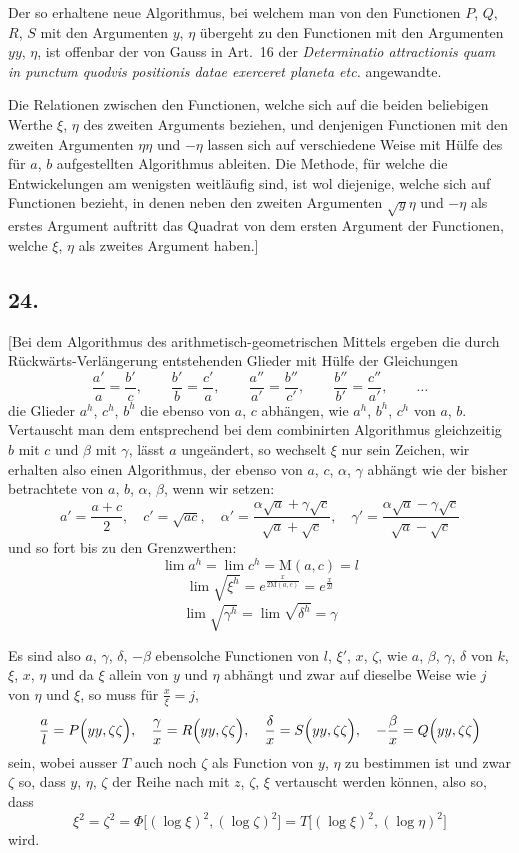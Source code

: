 \documentclass[10pt,a4paper]{article}
\newcommand{\M}{\text{M}}
\begin{document}
Der so erhaltene neue Algorithmus, bei welchem man von den Functionen
$P$, $Q$, $R$, $S$ mit den Argumenten $y$, $\eta$ übergeht zu den Functionen mit den
Argumenten $yy$, $\eta$, ist offenbar der von Gauss in Art.~16 der \textit{Determinatio attractionis quam in punctum quodvis positionis datae exerceret planeta etc.} angewandte.

Die Relationen zwischen den Functionen, welche sich auf die beiden beliebigen Werthe $\xi$, $\eta$ des zweiten Arguments beziehen, und denjenigen Functionen
mit den zweiten Argumenten $\eta\eta$ und $-\eta$ lassen sich auf verschiedene Weise mit
Hülfe des für $a$, $b$ aufgestellten Algorithmus ableiten. Die Methode, für welche die Entwickelungen am wenigsten weitläufig sind, ist wol diejenige, welche
sich auf Functionen bezieht, in denen neben den zweiten Argumenten $\sqrt{y}\eta$ und
$-\eta$ als erstes Argument auftritt das Quadrat von dem ersten Argument der Functionen, welche $\xi$, $\eta$ als zweites Argument haben.]


\subsection*{24.}

[Bei dem Algorithmus des arithmetisch-geometrischen Mittels ergeben die
durch Rückwärts-Verlängerung entstehenden Glieder mit Hülfe der Gleichungen
\[
\frac{a'}{a}=\frac{b'}{c}, \qquad \frac{b'}{b}=\frac{c'}{a}, \qquad
\frac{a''}{a'}=\frac{b''}{c'}, \qquad \frac{b''}{b'}=\frac{c''}{a'}, \qquad \ldots
\]
die Glieder $a^h$, $c^h$, $b^h$ die ebenso von $a$, $c$ abhängen, wie $a^h$, $b^h$, $c^h$ von $a$, $b$.
Vertauscht man dem entsprechend bei dem combinirten Algorithmus gleichzeitig
$b$ mit $c$ und $\beta$ mit $\gamma$, lässt $a$ ungeändert, so wechselt $\xi$ nur sein Zeichen, wir
erhalten also einen Algorithmus, der ebenso von $a$, $c$, $\alpha$, $\gamma$ abhängt wie der bisher betrachtete von $a$, $b$, $\alpha$, $\beta$, wenn wir setzen:
\[
a'=\frac{a+c}{2}, \quad c'=\sqrt{ac}, \quad
\alpha'=\frac{\alpha\sqrt{a}+\gamma\sqrt{c}}{\sqrt{a}+\sqrt{c}}, \quad
\gamma'=\frac{\alpha\sqrt{a}-\gamma\sqrt{c}}{\sqrt{a}-\sqrt{c}}
\]
und so fort bis zu den Grenzwerthen:
\[
\lim a^h = \lim c^h = \M(a,c) = l
\]
\[
\lim\sqrt{\xi^h} = e^{\frac{x}{2\M(a,c)}} = e^{\frac{x}{2l}}
\]
\[
\lim\sqrt{\gamma^h} = \lim\sqrt{\delta^h} = \gamma
\]

Es sind also $a$, $\gamma$, $\delta$, $-\beta$ ebensolche Functionen von $l$, $\xi'$, $x$, $\zeta$, wie $a$, $\beta$, $\gamma$, $\delta$ von
$k$, $\xi$, $x$, $\eta$ und da $\xi$ allein von $y$ und $\eta$ abhängt und zwar auf dieselbe Weise
wie $j$ von $\eta$ und $\xi$, so muss für $\frac{x}{\xi}=j$,
\[
\frac{a}{l}=P\Bigl(yy,\zeta\zeta\Bigr), \quad
\frac{\gamma}{x}=R\Bigl(yy,\zeta\zeta\Bigr), \quad
\frac{\delta}{x}=S\Bigl(yy,\zeta\zeta\Bigr), \quad
-\frac{\beta}{x}=Q\Bigl(yy,\zeta\zeta\Bigr)
\]
sein, wobei ausser $T$ auch noch $\zeta$ als Function von $y$, $\eta$ zu bestimmen ist und
zwar $\zeta$ so, dass $y$, $\eta$, $\zeta$ der Reihe nach mit $z$, $\zeta$, $\xi$ vertauscht werden können,
also so, dass
\[
\xi^2 = \zeta^2 = \Phi\bigl[(\log\xi)^2,(\log\zeta)^2\bigr] = T\bigl[(\log\xi)^2,(\log\eta)^2\bigr]
\]
wird.
\end{document}
